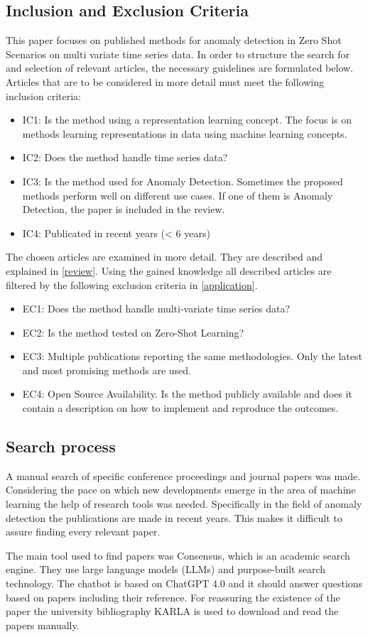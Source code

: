 \subsection{Inclusion and Exclusion Criteria}\label{criteria}
This paper focuses on published methods for anomaly detection in Zero Shot Scenarios on multi variate time series data. In order to structure the search for and selection of relevant articles, the necessary guidelines are formulated below. Articles that are to be considered in more detail must meet the following inclusion criteria:
\begin{itemize}
\item IC1: Is the method using a representation learning concept. The focus is on methods learning representations in data using machine learning concepts.
\item IC2: Does the method handle time series data?
\item IC3: Is the method used for Anomaly Detection. Sometimes the proposed methods perform well on different use cases. If one of them is Anomaly Detection, the paper is included in the review.
\item IC4: Publicated in recent years (< 6 years)
\end{itemize}
The chosen articles are examined in more detail. They are described and explained in \ref{review}. Using the gained knowledge all described articles are filtered by the following exclusion criteria in \ref{application}.
\begin{itemize}
\item EC1: Does the method handle multi-variate time series data?
\item EC2: Is the method tested on Zero-Shot Learning?
\item EC3: Multiple publications reporting the same methodologies. Only the latest and most promising methods are used.
\item EC4: Open Source Availability. Is the method publicly available and does it contain a description on how to implement and reproduce the outcomes.
\end{itemize}
\subsection{Search process}
A manual search of specific conference proceedings and journal papers was made. Considering the pace on which new developments emerge in the area of machine learning the help of research tools was needed. Specifically in the field of anomaly detection the publications are made in recent years. This makes it difficult to assure finding every relevant paper.

The main tool used to find papers was Consensus, which is an academic search engine. They use large language models (LLMs) and purpose-built search technology. The chatbot is based on ChatGPT 4.0 and it should answer questions based on papers including their reference. For reassuring the existence of the paper the university bibliography KARLA is used to download and read the papers manually.
